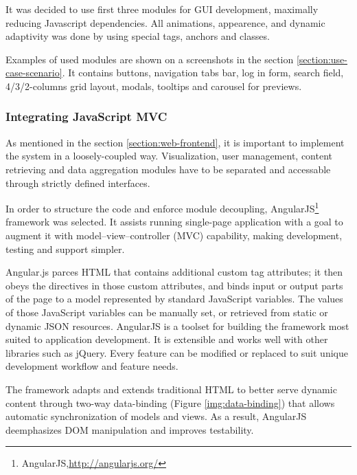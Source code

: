 It was decided to use first three modules for GUI development, maximally reducing Javascript dependencies. All animations, appearence, and dynamic adaptivity was done by using special tags, anchors and classes.

Examples of used modules are shown on a screenshots in the section \ref{section:use-case-scenario}. It contains buttons, navigation tabs bar, log in form, search field, 4/3/2-columns  grid layout, modals, tooltips and carousel for previews.

\subsubsection{Integrating JavaScript MVC}
As mentioned in the section \ref{section:web-frontend}, it is important to implement the system in a loosely-coupled way. Visualization, user management, content retrieving and data aggregation modules have to be separated and accessable through strictly defined interfaces.

In order to structure the code and enforce module decoupling, AngularJS\footnote{AngularJS,\url{http://angularjs.org/}} framework was selected. It assists running single-page application with a goal to augment it with model–view–controller (MVC) capability, making development, testing and support simpler.

Angular.js parces HTML that contains additional custom tag attributes; it then obeys the directives in those custom attributes, and binds input or output parts of the page to a model represented by standard JavaScript variables. The values of those JavaScript variables can be manually set, or retrieved from static or dynamic JSON resources\cite{ wiki:angular}. AngularJS is a toolset for building the framework most suited to application development. It is extensible and works well with other libraries such as jQuery. Every feature can be modified or replaced to suit unique development workflow and feature needs.

The framework adapts and extends traditional HTML to better serve dynamic content through two-way data-binding (Figure \ref{img:data-binding}) that allows automatic synchronization of models and views. As a result, AngularJS deemphasizes DOM manipulation and improves testability.

